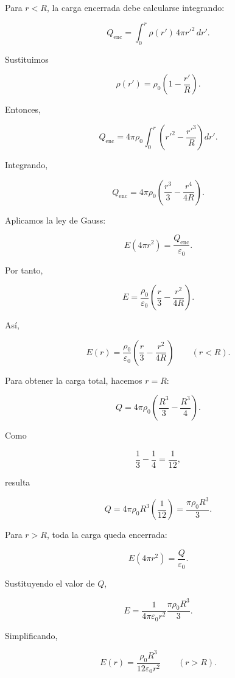 \begin{explicacion}

Para \(r<R\), la carga encerrada debe calcularse integrando:

\[
Q_{\text{enc}}
=
\int_0^r\rho(r')\,4\pi r'^2\,dr'.
\]

Sustituimos

\[
\rho(r')
=
\rho_0\left(1-\frac{r'}{R}\right).
\]

Entonces,

\[
Q_{\text{enc}}
=
4\pi\rho_0
\int_0^r
\left(
r'^2-\frac{r'^3}{R}
\right)dr'.
\]

Integrando,

\[
Q_{\text{enc}}
=
4\pi\rho_0
\left(
\frac{r^3}{3}
-
\frac{r^4}{4R}
\right).
\]

Aplicamos la ley de Gauss:

\[
E(4\pi r^2)
=
\frac{Q_{\text{enc}}}{\varepsilon_0}.
\]

Por tanto,

\[
E
=
\frac{\rho_0}{\varepsilon_0}
\left(
\frac{r}{3}
-
\frac{r^2}{4R}
\right).
\]

Así,

\[
\boxed{
E(r)
=
\frac{\rho_0}{\varepsilon_0}
\left(
\frac{r}{3}
-
\frac{r^2}{4R}
\right)
\qquad(r<R)
}.
\]

Para obtener la carga total, hacemos \(r=R\):

\[
Q
=
4\pi\rho_0
\left(
\frac{R^3}{3}
-
\frac{R^3}{4}
\right).
\]

Como

\[
\frac13-\frac14=\frac1{12},
\]

resulta

\[
Q
=
4\pi\rho_0R^3\left(\frac1{12}\right)
=
\boxed{\frac{\pi\rho_0R^3}{3}}.
\]

Para \(r>R\), toda la carga queda encerrada:

\[
E(4\pi r^2)
=
\frac{Q}{\varepsilon_0}.
\]

Sustituyendo el valor de \(Q\),

\[
E
=
\frac{1}{4\pi\varepsilon_0r^2}
\frac{\pi\rho_0R^3}{3}.
\]

Simplificando,

\[
\boxed{
E(r)
=
\frac{\rho_0R^3}
{12\varepsilon_0r^2}
\qquad(r>R)
}.
\]

\end{explicacion}